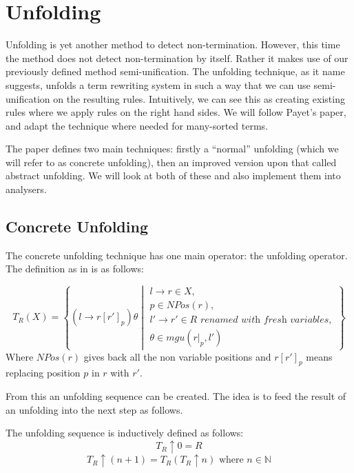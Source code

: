 \chapter{Unfolding}\label{unfolding}
Unfolding is yet another method to detect non-termination. However, this time the method does not detect non-termination by itself. Rather it makes use of our previously defined method semi-unification. The unfolding technique, as it name suggests, unfolds a term rewriting system in such a way that we can use semi-unification on the resulting rules. Intuitively, we can see this as creating existing rules where we apply rules on the right hand sides. We will follow Payet's paper\cite{Payet:Unfolding}, and adapt the technique where needed for many-sorted terms. 

The paper defines two main techniques: firstly a ``normal'' unfolding (which we will refer to as concrete unfolding), then an improved version upon that called abstract unfolding. We will look at both of these and also implement them into analysers. 

\section{Concrete Unfolding}
The concrete unfolding technique has one main operator: the unfolding operator. The definition as in \cite{Payet:Unfolding} is as follows:
\begin{definition}
\label{def:concunf}
\[
T_R(X) = \left\{ \left( l \rightarrow r\left[ r' \right]_p \right)\theta \middle\vert \begin{array}{l} 
l \rightarrow r \in X, \\
p \in \textit{NPos}(r), \\
l' \rightarrow r' \in R \textit{ renamed with fresh variables}, \\
\theta \in mgu(\left.r\right|_p, l')
\end{array}
\right\} 
\]
Where $\textit{NPos}(r)$ gives back all the non variable positions and $r\left[ r'\right]_p$ means replacing position $p$ in $r$ with $r'$. 
\end{definition}

From this an unfolding sequence can be created. The idea is to feed the result of an unfolding into the next step as follows. 
\begin{definition}
The unfolding sequence is inductively defined as follows:
$$T_R \uparrow 0 = R$$
$$T_R \uparrow (n + 1) = T_R(T_R \uparrow n) \text{ where } n \in \mathbb{N}$$ 
\end{definition}

